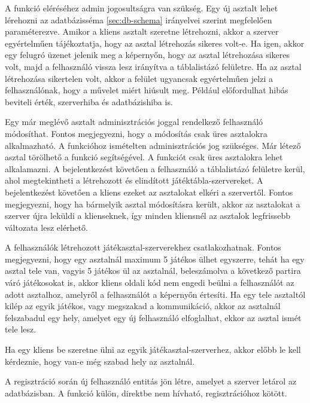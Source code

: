 A funkció eléréséhez admin jogosultságra van szükség. Egy új asztalt lehet lérehozni az adatbázisséma \ref{sec:db-schema} irányelvei szerint megfelelően paraméterezve. Amikor a kliens asztalt szeretne létrehozni, akkor a szerver egyértelműen tájékoztatja, hogy az asztal létrehozás sikeres volt-e. Ha igen, akkor egy felugró üzenet jelenik meg a képernyőn, hogy az asztal létrehozása sikeres volt, majd a felhasználó vissza lesz irányítva a táblalistázó felületre. Ha az asztal létrehozása sikertelen volt, akkor a felület ugyancsak egyértelműen jelzi a felhasználónak, hogy a művelet miért hiúsult meg. Például előfordulhat hibás beviteli érték, szerverhiba és adatbázishiba is.

Egy már meglévő asztalt adminisztrációs joggal rendelkező felhasználó módosíthat. Fontos megjegyezni, hogy a módosítás csak üres asztalokra alkalmazható.
A funkcióhoz ismételten adminisztrációs jog szükséges. Már létező asztal törölhető a funkció segítségével. A funkciót csak üres asztalokra lehet alkalamazni.
A bejelentkezést követően a felhasználó a táblalistázó felületre kerül, ahol megtekintheti a létrehozott és elindított játéktábla-szervereket. A bejelentkezést követően a kliens ezeket az asztalokat elkéri a szervertől. Fontos megjegyezni, hogy ha bármelyik asztal módosításra került, akkor az asztalokat a szerver újra leküldi a klienseknek, így minden kliensnél az asztalok legfrissebb változata lesz elérhető.

A felhasználók létrehozott játékasztal-szerverekhez csatlakozhatnak. Fontos megjegyezni, hogy egy asztalnál maximum 5 játékos ülhet egyszerre, tehát ha egy asztal tele van, vagyis 5 játékos ül az asztalnál, beleszámolva a következő partira váró játékosokat is, akkor kliens oldali kód nem engedi beülni a felhasználót az adott asztalhoz, amelyről a felhasználót a képernyőn értesíti. Ha egy tele asztaltól kilép az egyik játékos, vagy megszakad a kommunikáció, akkor az asztalnál felszabadul egy hely, amelyet egy új felhasználó elfoglalhat, ekkor az asztal ismét tele lesz.

Ha egy kliens be szeretne ülni az egyik játékasztal-szerverhez, akkor előbb le kell kérdeznie, hogy van-e még szabad hely az asztalnál.

A regisztráció során új felhasználó entitás jön létre, amelyet a szerver letárol az adatbázisban. A funkció külön, direktbe nem hívható, regisztrációhoz kötött.

